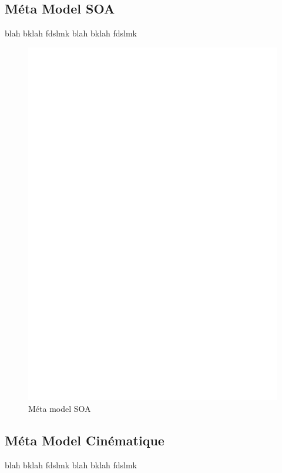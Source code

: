 \subsection{Méta Model SOA}\label{sub:soa}
blah bklah fdslmk blah bklah fdslmk 
\begin{figure}[htb]
  \centering
  \includegraphics[scale=.3]{img/SOA.eps}
  \caption{Méta model SOA}
  \label{fig:soa}
\end{figure}

\subsection{Méta Model Cinématique}\label{sub:cin}
blah bklah fdslmk blah bklah fdslmk 


